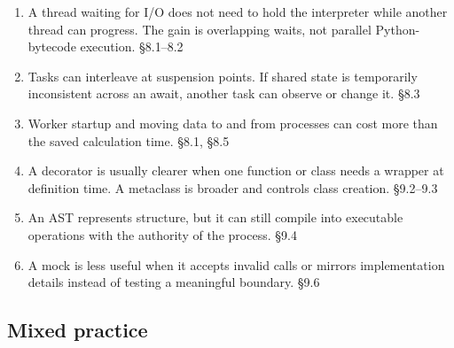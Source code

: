 \documentclass[11pt]{article}
\begin{document}
\begin{keepsection}
\begin{keepsection}
\begin{enumerate}
\item A thread waiting for I/O does not need to hold the interpreter while another thread can progress. The gain is overlapping waits, not parallel Python-bytecode execution. \hfill{\small\color{FAUblue}§8.1–8.2}
\item Tasks can interleave at suspension points. If shared state is temporarily inconsistent across an await, another task can observe or change it. \hfill{\small\color{FAUblue}§8.3}
\item Worker startup and moving data to and from processes can cost more than the saved calculation time. \hfill{\small\color{FAUblue}§8.1, §8.5}
\item A decorator is usually clearer when one function or class needs a wrapper at definition time. A metaclass is broader and controls class creation. \hfill{\small\color{FAUblue}§9.2–9.3}
\item An AST represents structure, but it can still compile into executable operations with the authority of the process. \hfill{\small\color{FAUblue}§9.4}
\item A mock is less useful when it accepts invalid calls or mirrors implementation details instead of testing a meaningful boundary. \hfill{\small\color{FAUblue}§9.6}
\end{enumerate}

\end{keepsection}
\begin{keepsection}\subsection{Mixed practice}


\end{keepsection}
\end{keepsection}
\end{document}
